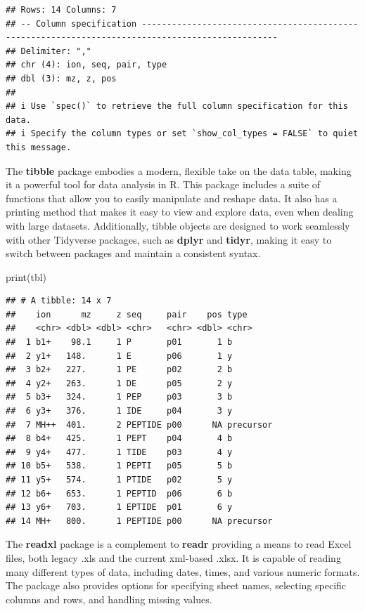 \documentclass[
]{book}
\newenvironment{Shaded}{\begin{snugshade}}{\end{snugshade}}
\newcommand{\FunctionTok}[1]{\textcolor[rgb]{0.00,0.00,0.00}{#1}}
\newcommand{\NormalTok}[1]{#1}
\begin{document}
\begin{verbatim}
## Rows: 14 Columns: 7
## -- Column specification -------------------------------------------------------------------------------------------------
## Delimiter: ","
## chr (4): ion, seq, pair, type
## dbl (3): mz, z, pos
## 
## i Use `spec()` to retrieve the full column specification for this data.
## i Specify the column types or set `show_col_types = FALSE` to quiet this message.
\end{verbatim}

The \textbf{tibble} package embodies a modern, flexible take on the data table, making it a powerful tool for data analysis in R. This package includes a suite of functions that allow you to easily manipulate and reshape data. It also has a printing method that makes it easy to view and explore data, even when dealing with large datasets. Additionally, tibble objects are designed to work seamlessly with other Tidyverse packages, such as \textbf{dplyr} and \textbf{tidyr}, making it easy to switch between packages and maintain a consistent syntax.

\begin{Shaded}
\begin{Highlighting}[]
\FunctionTok{print}\NormalTok{(tbl)}
\end{Highlighting}
\end{Shaded}

\begin{verbatim}
## # A tibble: 14 x 7
##    ion      mz     z seq     pair    pos type     
##    <chr> <dbl> <dbl> <chr>   <chr> <dbl> <chr>    
##  1 b1+    98.1     1 P       p01       1 b        
##  2 y1+   148.      1 E       p06       1 y        
##  3 b2+   227.      1 PE      p02       2 b        
##  4 y2+   263.      1 DE      p05       2 y        
##  5 b3+   324.      1 PEP     p03       3 b        
##  6 y3+   376.      1 IDE     p04       3 y        
##  7 MH++  401.      2 PEPTIDE p00      NA precursor
##  8 b4+   425.      1 PEPT    p04       4 b        
##  9 y4+   477.      1 TIDE    p03       4 y        
## 10 b5+   538.      1 PEPTI   p05       5 b        
## 11 y5+   574.      1 PTIDE   p02       5 y        
## 12 b6+   653.      1 PEPTID  p06       6 b        
## 13 y6+   703.      1 EPTIDE  p01       6 y        
## 14 MH+   800.      1 PEPTIDE p00      NA precursor
\end{verbatim}

The \textbf{readxl} package is a complement to \textbf{readr} providing a means to read Excel files, both legacy .xls and the current xml-based .xlsx. It is capable of reading many different types of data, including dates, times, and various numeric formats. The package also provides options for specifying sheet names, selecting specific columns and rows, and handling missing values.
\end{document}
